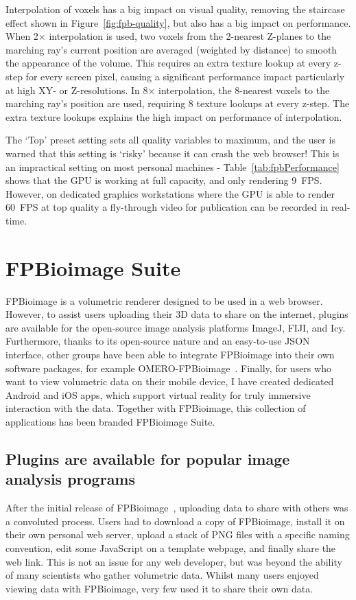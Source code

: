 Interpolation of voxels has a big impact on visual quality, removing the staircase effect shown in Figure~\ref{fig:fpb-quality}, but also has a big impact on performance.
When 2$\times$ interpolation is used, two voxels from the 2-nearest Z-planes to the marching ray's current position are averaged (weighted by distance) to smooth the appearance of the volume.
This requires an extra texture lookup at every z-step for every screen pixel, causing a significant performance impact particularly at high XY- or Z-resolutions.
In 8$\times$ interpolation, the 8-nearest voxels to the marching ray's position are used, requiring 8 texture lookups at every z-step.
The extra texture lookups explains the high impact on performance of interpolation.

The `Top' preset setting sets all quality variables to maximum, and the user is warned that this setting is `risky' because it can crash the web browser!
This is an impractical setting on most personal machines - Table~\ref{tab:fpbPerformance} shows that the GPU is working at full capacity, and only rendering \SI{9}{FPS}.
However, on dedicated graphics workstations where the GPU is able to render \SI{60}{FPS} at top quality a fly-through video for publication can be recorded in real-time.

\section{FPBioimage Suite}
FPBioimage is a volumetric renderer designed to be used in a web browser.
However, to assist users uploading their 3D data to share on the internet, plugins are available for the open-source image analysis platforms ImageJ, FIJI, and Icy.
Furthermore, thanks to its open-source nature and an easy-to-use JSON interface, other groups have been able to integrate FPBioimage into their own software packages, for example OMERO-FPBioimage~\cite{omero2018website}.
Finally, for users who want to view volumetric data on their mobile device, I have created dedicated Android and iOS apps, which support virtual reality for truly immersive interaction with the data. %
Together with FPBioimage, this collection of applications has been branded FPBioimage Suite.

\subsection{Plugins are available for popular image analysis programs}
After the initial release of FPBioimage~\cite{fantham2017new}, uploading data to share with others was a convoluted process.
Users had to download a copy of FPBioimage, install it on their own personal web server, upload a stack of PNG files with a specific naming convention, edit some JavaScript on a template webpage, and finally share the web link.
This is not an issue for any web developer, but was beyond the ability of many scientists who gather volumetric data.
Whilst many users enjoyed viewing data with FPBioimage, very few used it to share their own data.

